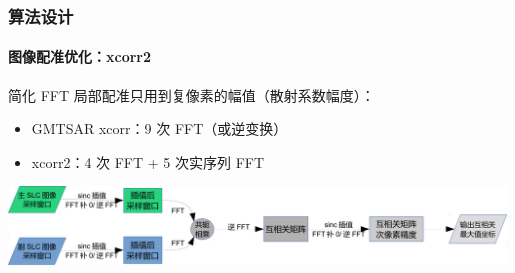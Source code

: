 \documentclass{beamer}
\begin{document}
\begin{frame}
    \frametitle{算法设计}
    \framesubtitle{图像配准优化：xcorr2}

    \begin{block}{简化 FFT}
        局部配准只用到复像素的幅值（散射系数幅度）：
        \begin{itemize}
            \item GMTSAR xcorr：9 次 FFT（或逆变换）
            \item xcorr2：4 次 FFT + 5 次实序列 FFT
        \end{itemize}
        \includegraphics[width=0.99\textwidth]{figures/xcorr-crop.pdf}
    \end{block}
\end{frame}
\end{document}

